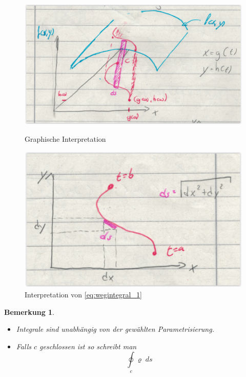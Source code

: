 \documentclass[12pt,a4paper]{report}%
\newtheorem{bem}{Bemerkung}[section]
\numberwithin{equation}{section}
\numberwithin{equation}{subsection}
\begin{document}
	  \begin{figure}[H] 
		\centering
		\begin{minipage}{.5\textwidth}
		  \centering
		  \includegraphics[width=0.9\linewidth]{wegintegral_erster_1.png}
		  \caption{Graphische Interpretation}
		  \label{fig:wegintegral_erster_1}
		\end{minipage}%
		\begin{minipage}{.5\textwidth}
		  \centering
		  \includegraphics[width=0.8\linewidth]{wegintegral_erster_2.png}
		  \caption{Interpretation von \protect\eqref{eq:wegintegral_1}}
		  \label{fig:wegintegral_erster_2}
		\end{minipage}
		\end{figure}
		\begin{bem}
			\begin{itemize}
			  \item[a) ] Integrale sind unabhängig von der gewählten Parametrisierung.
			  \item[b) ] Falls $c$ geschlossen ist so schreibt man 
				  \begin{equation}
				    \oint\limits_c \varrho \; ds
				  \end{equation}
			\end{itemize}
		\end{bem}
\end{document}
